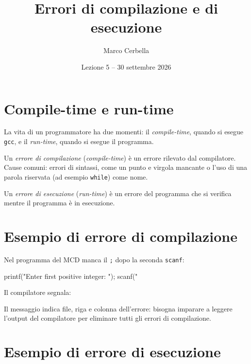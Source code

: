 \documentclass[11pt,a4paper]{article}
\title{Errori di compilazione e di esecuzione}
\author{Marco Cerbella}
\date{Lezione 5 -- 30 settembre 2026}
\begin{document}
\maketitle

\section{Compile-time e run-time}

La vita di un programmatore ha due momenti: il \emph{compile-time}, quando si
esegue \texttt{gcc}, e il \emph{run-time}, quando si esegue il programma.

\begin{definizione}
Un \emph{errore di compilazione} (\emph{compile-time}) è un errore rilevato dal
compilatore. Cause comuni: errori di sintassi, come un punto e virgola mancante
o l'uso di una parola riservata (ad esempio \lstinline|while|) come nome.
\end{definizione}

\begin{definizione}
Un \emph{errore di esecuzione} (\emph{run-time}) è un errore del programma che
si verifica mentre il programma è in esecuzione.
\end{definizione}

\section{Esempio di errore di compilazione}

Nel programma del MCD manca il \texttt{;} dopo la seconda \lstinline|scanf|:
\begin{codice}
printf("Enter first positive integer: \n");
scanf("%
\end{codice}

Il compilatore segnala:

Il messaggio indica file, riga e colonna dell'errore: bisogna imparare a
leggere l'output del compilatore per eliminare tutti gli errori di compilazione.

\section{Esempio di errore di esecuzione}
\end{document}
